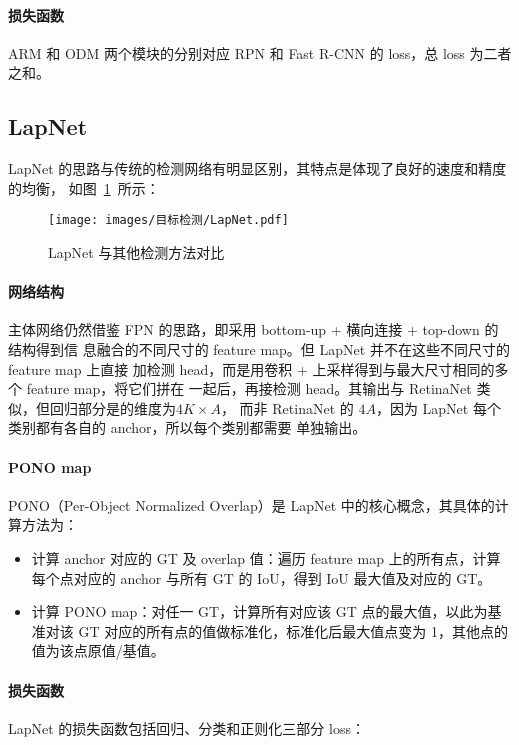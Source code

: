 \paragraph{损失函数}
ARM 和 ODM 两个模块的分别对应 RPN 和 Fast R-CNN 的 loss，总 loss 为二者之和。

\subsection{LapNet}
LapNet 的思路与传统的检测网络有明显区别，其特点是体现了良好的速度和精度的均衡，
如图~\ref{fig:LapNet}~所示：

\begin{figure}[ht]
  \centering
  \texttt{[image: images/目标检测/LapNet.pdf]}
  \caption{LapNet 与其他检测方法对比}
  \label{fig:LapNet}
\end{figure}

\paragraph{网络结构}
主体网络仍然借鉴 FPN 的思路，即采用 bottom-up + 横向连接 + top-down 的结构得到信
息融合的不同尺寸的 feature map。但 LapNet 并不在这些不同尺寸的feature map 上直接
加检测 head，而是用卷积 + 上采样得到与最大尺寸相同的多个 feature map，将它们拼在
一起后，再接检测 head。其输出与 RetinaNet 类似，但回归部分是的维度为$4 K \times A$，
而非 RetinaNet 的 $4A$，因为 LapNet 每个类别都有各自的 anchor，所以每个类别都需要
单独输出。

\paragraph{PONO map}
PONO（Per-Object Normalized Overlap）是 LapNet 中的核心概念，其具体的计算方法为：

\begin{itemize}
  \item 计算 anchor 对应的 GT 及 overlap 值：遍历 feature map 上的所有点，计算
    每个点对应的 anchor 与所有 GT 的 IoU，得到 IoU 最大值及对应的 GT。
  \item 计算 PONO map：对任一 GT，计算所有对应该 GT 点的最大值，以此为基准对该 GT
    对应的所有点的值做标准化，标准化后最大值点变为 1，其他点的值为该点原值/基值。
\end{itemize}

\paragraph{损失函数}
LapNet 的损失函数包括回归、分类和正则化三部分 loss：

